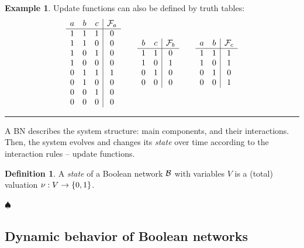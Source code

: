 \documentclass[
	digital, oneside, nosansbold, nocolorbold, nolot, nolof
]{fithesis4}
\theoremstyle{definition}
\newtheorem{definition}{Definition}
\theoremstyle{definition}
\newtheorem{example}{Example}
\newenvironment{ldefinition}
    {\begin{definition}}
	{\par\hspace{\stretch{1}}$\spadesuit$\hspace{\stretch{1}}
     \par\end{definition}}
\newenvironment{lexample}
    {\begin{example}}
    {\par\hspace{\stretch{1}}\rule{0.2\textwidth}{0.01ex}\hspace{\stretch{1}}
     \par\end{example}}
\DeclarePairedDelimiter{\set}{\{}{\}}
\begin{document}
\begin{lexample}
Update functions can also be defined by truth tables:
\[
\begin{array}{ccc|c}
    a & b & c & \mathcal{F}_a\\
    \hline
    1 & 1 & 1 & 0\\
    1 & 1 & 0 & 0\\
    1 & 0 & 1 & 0\\
    1 & 0 & 0 & 0\\
    0 & 1 & 1 & 1\\
    0 & 1 & 0 & 0\\
    0 & 0 & 1 & 0\\
    0 & 0 & 0 & 0\\
\end{array}
\qquad
\begin{array}{cc|c}
    b & c & \mathcal{F}_b\\
    \hline
    1 & 1 & 0\\
    1 & 0 & 1\\
    0 & 1 & 0\\
    0 & 0 & 0\\
\end{array}
\qquad
\begin{array}{cc|c}
    a & b & \mathcal{F}_c\\
    \hline
    1 & 1 & 1\\
    1 & 0 & 1\\
    0 & 1 & 0\\
    0 & 0 & 1\\
\end{array}
\]
\end{lexample}

A BN describes the system structure: main components, and their interactions.
Then, the system evolves and changes its \emph{state} over time according to the
interaction rules -- update functions.

\begin{ldefinition}
A \emph{state} of a Boolean network $\mathcal{B}$ with variables $V$ is a
(total) valuation $\nu : V \to \set{0, 1}$.
\end{ldefinition}

\subsection{Dynamic behavior of Boolean networks}
\end{document}
